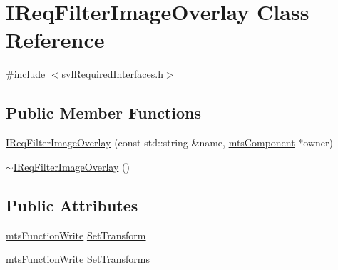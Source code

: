 \hypertarget{class_i_req_filter_image_overlay}{\section{I\-Req\-Filter\-Image\-Overlay Class Reference}
\label{class_i_req_filter_image_overlay}
}


{\ttfamily \#include $<$svl\-Required\-Interfaces.\-h$>$}

\subsection*{Public Member Functions}
\begin{DoxyCompactItemize}
\item 
\hyperlink{class_i_req_filter_image_overlay_acbe18271dd5b8a5c89dc4061bf4f374b}{I\-Req\-Filter\-Image\-Overlay} (const std\-::string \&name, \hyperlink{classmts_component}{mts\-Component} $\ast$owner)
\item 
\hyperlink{class_i_req_filter_image_overlay_a136c2fcb8b04d7b91468810e38b38584}{$\sim$\-I\-Req\-Filter\-Image\-Overlay} ()
\end{DoxyCompactItemize}
\subsection*{Public Attributes}
\begin{DoxyCompactItemize}
\item 
\hyperlink{classmts_function_write}{mts\-Function\-Write} \hyperlink{class_i_req_filter_image_overlay_aea8a378df3af93768b3ffd3c6eb9ad2e}{Set\-Transform}
\item 
\hyperlink{classmts_function_write}{mts\-Function\-Write} \hyperlink{class_i_req_filter_image_overlay_a23171709938c0c03dfe317aca65bb75b}{Set\-Transforms}
\end{DoxyCompactItemize}


